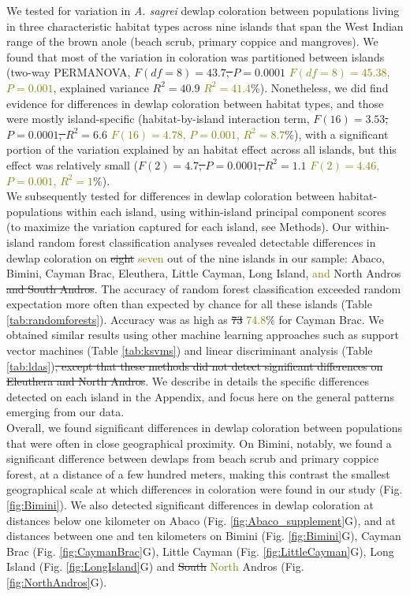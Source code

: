 We tested for variation in \textit{A. sagrei} dewlap coloration between populations living in three characteristic habitat types across nine islands that span the West Indian range of the brown anole (beach scrub, primary coppice and mangroves). We found that most of the variation in coloration was partitioned between islands (two-way PERMANOVA, \sout{$F(df = 8) = 43.7$, $P = 0.0001$} \textcolor{olive}{$F(df = 8) = 45.38$, $P = 0.001$}, explained variance \sout{$R^2 = 40.9$} \textcolor{olive}{$R^2 = 41.4$}\%). Nonetheless, we did find evidence for differences in dewlap coloration between habitat types, and those were mostly island-specific (habitat-by-island interaction term, \sout{$F(16) = 3.53$, $P = 0.0001$, $R^2 = 6.6$} \textcolor{olive}{$F(16) = 4.78$, $P = 0.001$, $R^2 = 8.7$}\%), with a significant portion of the variation explained by an habitat effect across all islands, but this effect was relatively small (\sout{$F(2) = 4.7$, $P = 0.0001$, $R^2 = 1.1$} \textcolor{olive}{$F(2) = 4.46$, $P = 0.001$, $R^2 = 1$}\%).\\

We subsequently tested for differences in dewlap coloration between habitat-populations within each island, using within-island principal component scores (to maximize the variation captured for each island, see Methods). Our within-island random forest classification analyses revealed detectable differences in dewlap coloration on \sout{eight} \textcolor{olive}{seven} out of the nine islands in our sample: Abaco, Bimini, Cayman Brac, Eleuthera, Little Cayman, Long Island, \textcolor{olive}{and} North Andros \sout{and South Andros}. The accuracy of random forest classification exceeded random expectation more often than expected by chance for all these islands (Table \ref{tab:randomforests}). Accuracy was as high as \sout{73} \textcolor{olive}{74.8}\% for Cayman Brac. We obtained similar results using other machine learning approaches such as support vector machines (Table \ref{tab:ksvms}) and linear discriminant analysis (Table \ref{tab:ldas})\sout{, except that these methods did not detect significant differences on Eleuthera and North Andros}. We describe in details the specific differences detected on each island in the Appendix, and focus here on the general patterns emerging from our data.\\

Overall, we found significant differences in dewlap coloration between populations that were often in close geographical proximity. On Bimini, notably, we found a significant difference between dewlaps from beach scrub and primary coppice forest, at a distance of a few hundred meters, making this contrast the smallest geographical scale at which differences in coloration were found in our study (Fig. \ref{fig:Bimini}). We also detected significant differences in dewlap coloration at distances below one kilometer on Abaco (Fig. \ref{fig:Abaco_supplement}G), and at distances between one and ten kilometers on Bimini (Fig. \ref{fig:Bimini}G), Cayman Brac (Fig. \ref{fig:CaymanBrac}G), Little Cayman (Fig. \ref{fig:LittleCayman}G), Long Island (Fig. \ref{fig:LongIsland}G) and \sout{South} \textcolor{olive}{North} Andros (Fig. \ref{fig:NorthAndros}G).\\

